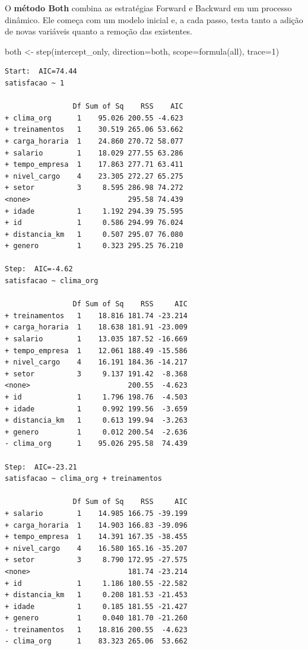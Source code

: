 \documentclass[
  letterpaper,
  DIV=11,
  numbers=noendperiod]{scrartcl}
\newenvironment{Shaded}{\begin{snugshade}}{\end{snugshade}}
\newcommand{\AttributeTok}[1]{\textcolor[rgb]{0.40,0.45,0.13}{#1}}
\newcommand{\DecValTok}[1]{\textcolor[rgb]{0.68,0.00,0.00}{#1}}
\newcommand{\FunctionTok}[1]{\textcolor[rgb]{0.28,0.35,0.67}{#1}}
\newcommand{\NormalTok}[1]{\textcolor[rgb]{0.00,0.23,0.31}{#1}}
\newcommand{\OtherTok}[1]{\textcolor[rgb]{0.00,0.23,0.31}{#1}}
\newcommand{\StringTok}[1]{\textcolor[rgb]{0.13,0.47,0.30}{#1}}
\begin{document}
O \textbf{método Both} combina as estratégias Forward e Backward em um
processo dinâmico. Ele começa com um modelo inicial e, a cada passo,
testa tanto a adição de novas variáveis quanto a remoção das existentes.

\begin{Shaded}
\begin{Highlighting}[]
\NormalTok{both }\OtherTok{\textless{}{-}} \FunctionTok{step}\NormalTok{(intercept\_only, }\AttributeTok{direction=}\StringTok{\textquotesingle{}both\textquotesingle{}}\NormalTok{, }\AttributeTok{scope=}\FunctionTok{formula}\NormalTok{(all), }\AttributeTok{trace=}\DecValTok{1}\NormalTok{)}
\end{Highlighting}
\end{Shaded}

\begin{verbatim}
Start:  AIC=74.44
satisfacao ~ 1

                Df Sum of Sq    RSS    AIC
+ clima_org      1    95.026 200.55 -4.623
+ treinamentos   1    30.519 265.06 53.662
+ carga_horaria  1    24.860 270.72 58.077
+ salario        1    18.029 277.55 63.286
+ tempo_empresa  1    17.863 277.71 63.411
+ nivel_cargo    4    23.305 272.27 65.275
+ setor          3     8.595 286.98 74.272
<none>                       295.58 74.439
+ idade          1     1.192 294.39 75.595
+ id             1     0.586 294.99 76.024
+ distancia_km   1     0.507 295.07 76.080
+ genero         1     0.323 295.25 76.210

Step:  AIC=-4.62
satisfacao ~ clima_org

                Df Sum of Sq    RSS     AIC
+ treinamentos   1    18.816 181.74 -23.214
+ carga_horaria  1    18.638 181.91 -23.009
+ salario        1    13.035 187.52 -16.669
+ tempo_empresa  1    12.061 188.49 -15.586
+ nivel_cargo    4    16.191 184.36 -14.217
+ setor          3     9.137 191.42  -8.368
<none>                       200.55  -4.623
+ id             1     1.796 198.76  -4.503
+ idade          1     0.992 199.56  -3.659
+ distancia_km   1     0.613 199.94  -3.263
+ genero         1     0.012 200.54  -2.636
- clima_org      1    95.026 295.58  74.439

Step:  AIC=-23.21
satisfacao ~ clima_org + treinamentos

                Df Sum of Sq    RSS     AIC
+ salario        1    14.985 166.75 -39.199
+ carga_horaria  1    14.903 166.83 -39.096
+ tempo_empresa  1    14.391 167.35 -38.455
+ nivel_cargo    4    16.580 165.16 -35.207
+ setor          3     8.790 172.95 -27.575
<none>                       181.74 -23.214
+ id             1     1.186 180.55 -22.582
+ distancia_km   1     0.208 181.53 -21.453
+ idade          1     0.185 181.55 -21.427
+ genero         1     0.040 181.70 -21.260
- treinamentos   1    18.816 200.55  -4.623
- clima_org      1    83.323 265.06  53.662


\end{verbatim}
\end{document}

